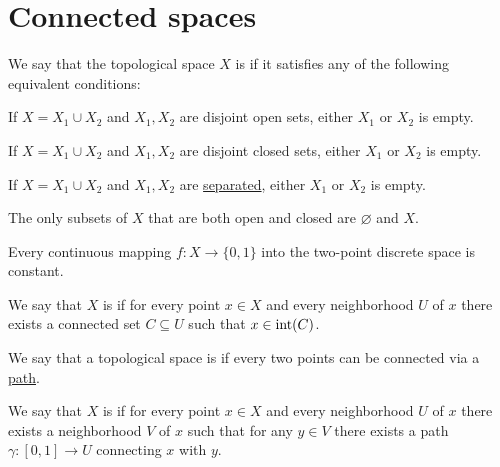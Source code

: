 \section{Connected spaces}\label{sec:connected_spaces}

\begin{definition}\label{def:connected_space}
  We say that the topological space \( X \) is  if it satisfies any of the following equivalent conditions:
  \begin{thmenum}
     If \( X = X_1 \cup X_2 \) and \( X_1, X_2 \) are disjoint open sets, either \( X_1 \) or \( X_2 \) is empty.

     If \( X = X_1 \cup X_2 \) and \( X_1, X_2 \) are disjoint closed sets, either \( X_1 \) or \( X_2 \) is empty.

     If \( X = X_1 \cup X_2 \) and \( X_1, X_2 \) are \hyperref[def:topological_space_separation]{separated}, either \( X_1 \) or \( X_2 \) is empty.

     The only subsets of \( X \) that are both open and closed are \( \varnothing \) and \( X \).

     Every continuous mapping \( f: X \to \{ 0, 1 \} \) into the two-point discrete space is constant.
  \end{thmenum}
\end{definition}

\begin{definition}\label{def:locally_connected_space}
  We say that \( X \) is  if for every point \( x \in X \) and every neighborhood \( U \) of \( x \) there exists a connected set \( C \subseteq U \) such that \( x \in \operatorname{int}(C) \).
\end{definition}

\begin{definition}\label{def:path_connected_space}
  We say that a topological space is  if every two points can be connected via a \hyperref[def:parametric_curve]{path}.
\end{definition}

\medskip

\begin{definition}\label{def:locally_path_connected_space}
  We say that \( X \) is  if for every point \( x \in X \) and every neighborhood \( U \) of \( x \) there exists a neighborhood \( V \) of \( x \) such that for any \( y \in V \) there exists a path \( \gamma: [0, 1] \to U \) connecting \( x \) with \( y \).
\end{definition}

